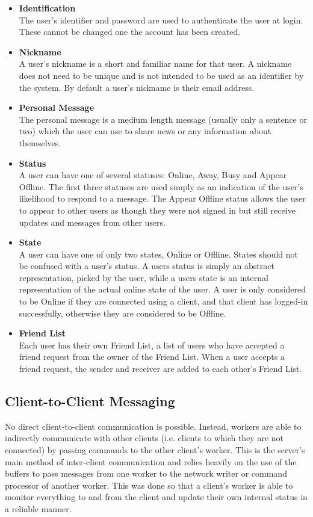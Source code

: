 \begin{itemize}
\item{{\bf Identification}\\
The user's identifier and password are used to authenticate the user at login. These cannot be changed one the account has been created.} 

\item{{\bf Nickname}\\
A user's nickname is a short and familiar name for that user. A nickname does not need to be unique and is not intended to be used as an identifier by the system. By default a user's nickname is their email address.}

\item{{\bf Personal Message}\\
The personal message is a medium length message (usually only a sentence or two) which the user can use to share news or any information about themselves.}

\item{{\bf Status}\\
A user can have one of several statuses: Online, Away, Busy and Appear Offline. The first three statuses are used simply as an indication of the user's likelihood to respond to a message. The Appear Offline status allows the user to appear to other users as though they were not signed in but still receive updates and messages from other users.}

\item{{\bf State}\\
A user can have one of only two states, Online or Offline. States should not be confused with a user's status. A users status is simply an abstract representation, picked by the user, while a users state is an internal representation of the actual online state of the user. A user is only considered to be Online if they are connected using a client, and that client has logged-in successfully, otherwise they are considered to be Offline.}

\item{{\bf Friend List}\\
Each user has their own Friend List, a list of users who have accepted a friend request from the owner of the Friend List. When a user accepts a friend request, the sender and receiver are added to each other's Friend List.}
\end{itemize}

\subsection{Client-to-Client Messaging}
\label{c2c}
No direct client-to-client communication is possible. Instead, workers are able to indirectly communicate with other clients (i.e. clients to which they are not connected) by passing commands to the other client's worker. This is the server's main method of inter-client communication and relies heavily on the use of the buffers to pass messages from one worker to the network writer or command processor of another worker. This was done so that a client's worker is able to monitor everything to and from the client and update their own internal status in a reliable manner.

